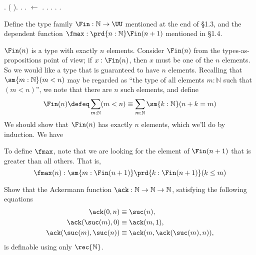 \begin{coqdoccode}
\coqdocindent{1.00em}
 .\coqdoceol
\coqdocindent{1.00em}
 (     \coqdocnotation{=}     ).  .  .  \ensuremath{\leftarrow} . .\coqdoceol
\coqdocindent{1.00em}
 . .\coqdoceol
\coqdocnoindent
{}.\coqdoceol
\coqdocemptyline
\end{coqdoccode}
Define the type family $\Fin : \mathbb{N} \to \UU$
mentioned at the end of \S1.3, and the dependent function $\fmax :
\prd{n : \mathbb{N}} \Fin(n + 1)$ mentioned in \S1.4.


\soln  
$\Fin(n)$ is a type with exactly $n$ elements.  Consider $\Fin(n)$ from the
types-as-propositions point of view; if $x : \Fin(n)$, then $x$ must be one of
the $n$ elements.  So we would like a type that is guaranteed to have $n$
elements.  Recalling that $\sm{m:\mathbb{N}}(m < n)$ may be regarded as ``the
type of all elements $m : \mathbb{N}$ such that $(m < n)$'', we note that there
are $n$ such elements, and define
\[
  \Fin(n) 
  \defeq \sum_{m:\mathbb{N}} (m < n)
  \equiv \sum_{m:\mathbb{N}} \sm{k:\mathbb{N}}(n+k = m)
\]
We should show that $\Fin(n)$ has exactly $n$ elements, which we'll do by
induction.  We have


To define $\fmax$, note that we are looking for the element of $\Fin(n+1)$ that
is greater than all others.  That is,
\[
\fmax(n) : \sm{m:\Fin(n+1)} \prd{k:\Fin(n+1)} (k \leq m)
\]
\begin{coqdoccode}
\coqdocemptyline
\end{coqdoccode}


Show that the Ackermann function $\ack : \mathbb{N} \to
\mathbb{N} \to \mathbb{N}$,
satisfying the following equations
\begin{align*}
  \ack(0, n) &\equiv \suc(n), \\
  \ack(\suc(m), 0) &\equiv \ack(m, 1), \\
  \ack(\suc(m), \suc(n)) &\equiv \ack(m, \ack(\suc(m), n)),
\end{align*}
is definable using only $\rec{\mathbb{N}}$.


